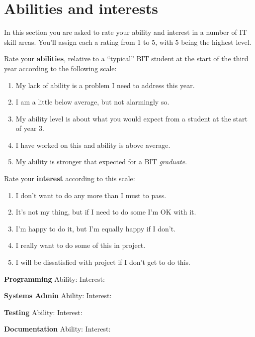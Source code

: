 \documentclass{article}
\begin{document}
\section*{Abilities and interests}
In this section you are asked to rate your ability and interest in a number of IT skill areas. You'll assign each a rating from 1 to 5, with 5 being the highest level.

Rate your \textbf{abilities}, relative to a ``typical'' BIT student at the start of the third year according to the following scale:

\begin{enumerate}
	\item My lack of ability is a problem I need to address this year.
	\item I am a little below average, but not alarmingly so.
	\item My ability level is about what you would expect from a student at the start of year 3.
	\item I have worked on this and ability is above average.
	\item My ability is stronger that expected for a BIT \emph{graduate}.
\end{enumerate}

Rate your \textbf{interest} according to this scale:

\begin{enumerate}
	\item I don't want to do any more than I must to pass.
	\item It's not my thing, but if I need to do some I'm OK with it.
	\item I'm happy to do it, but I'm equally happy if I don't.
	\item I really want to do some of this in project.
	\item I will be dissatisfied with project if I don't get to do this.
\end{enumerate}

\textbf{Programming} \qquad Ability: \qquad Interest: 
\vspace{5mm}

\textbf{Systems Admin} \qquad Ability: \qquad Interest: 
\vspace{5mm}

\textbf{Testing} \qquad Ability: \qquad Interest: 
\vspace{5mm}

\textbf{Documentation} \qquad Ability: \qquad Interest: 
\vspace{5mm}
\end{document}
